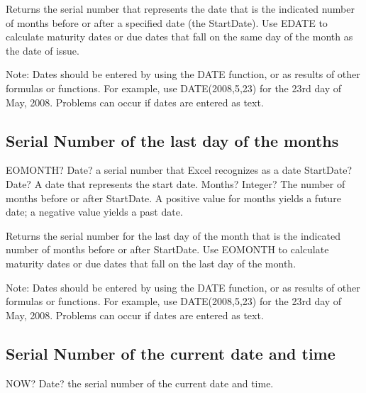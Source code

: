 \vspace{0.3cm}
Returns the serial number that represents the date that is the indicated number of months before or after a specified date (the StartDate). Use EDATE to calculate maturity dates or due dates that fall on the same day of the month as the date of issue.

Note: Dates should be entered by using the DATE function, or as results of other formulas or functions. For example, use DATE(2008,5,23) for the 23rd day of May, 2008. Problems can occur if dates are entered as text.





\subsection{Serial Number of the last day of the months}

\begin{mpFunctionsExtract}
	\mpWorksheetFunctionTwoNotImplemented
	{EOMONTH? Date? a serial number that Excel recognizes as a date}
	{StartDate? Date? A date that represents the start date.}
	{Months? Integer? The number of months before or after StartDate. A positive value for months yields a future date; a negative value yields a past date.}
\end{mpFunctionsExtract}

\vspace{0.3cm}
Returns the serial number for the last day of the month that is the indicated number of months before or after StartDate. Use EOMONTH to calculate maturity dates or due dates that fall on the last day of the month.

Note: Dates should be entered by using the DATE function, or as results of other formulas or functions. For example, use DATE(2008,5,23) for the 23rd day of May, 2008. Problems can occur if dates are entered as text.





\subsection{Serial Number of the current date and time}

\begin{mpFunctionsExtract}
	\mpWorksheetFunctionZeroNotImplemented
	{NOW? Date? the serial number of the current date and time.}
\end{mpFunctionsExtract}




